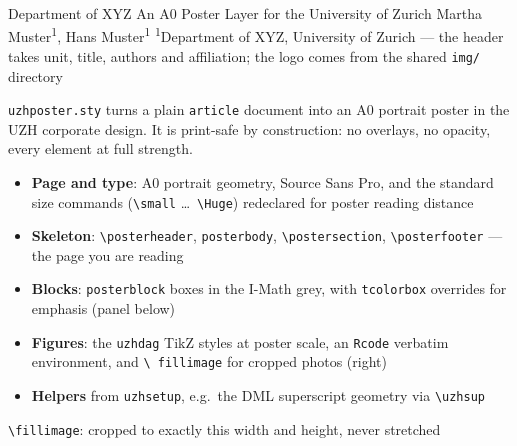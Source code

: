 \documentclass[10pt]{article}
\begin{document}
\posterheader
  {Department of XYZ}
  {An A0 Poster Layer for the University of Zurich}
  {Martha Muster\textsuperscript{1}, Hans Muster\textsuperscript{1}}
  {\textsuperscript{1}Department of XYZ, University of Zurich ---
   the header takes unit, title, authors and affiliation; the logo comes
   from the shared \texttt{img/} directory}

\begin{posterbody}


\begin{minipage}[c]{0.60\linewidth}
  \texttt{uzhposter.sty} turns a plain \texttt{article} document into an A0
  portrait poster in the UZH corporate design. It is print-safe by
  construction: no overlays, no opacity, every element at full strength.

  \vspace{4mm}
  \begin{itemize}
    \setlength{\itemsep}{2mm}
    \item \textbf{Page and type}: A0 portrait geometry, Source Sans Pro, and
      the standard size commands (\texttt{\textbackslash small} \ldots\
      \texttt{\textbackslash Huge}) redeclared for poster reading distance
    \item \textbf{Skeleton}: \texttt{\textbackslash posterheader},
      \texttt{posterbody}, \texttt{\textbackslash postersection},
      \texttt{\textbackslash posterfooter} --- the page you are reading
    \item \textbf{Blocks}: \texttt{posterblock} boxes in the I-Math grey,
      with \texttt{tcolorbox} overrides for emphasis (panel below)
    \item \textbf{Figures}: the \texttt{uzhdag} TikZ styles at poster scale,
      an \texttt{Rcode} verbatim environment, and \texttt{\textbackslash
      fillimage} for cropped photos (right)
    \item \textbf{Helpers} from \texttt{uzhsetup}, e.g.\ the
      DML superscript geometry via
      \texttt{\textbackslash uzhsup}
  \end{itemize}
\end{minipage}\hfill
\begin{minipage}[c]{0.36\linewidth}
  \begin{center}

    \vspace{2mm}
    {\footnotesize \texttt{\textbackslash fillimage}: cropped to exactly
     this width and height, never stretched}
  \end{center}
\end{minipage}


\end{posterbody}
\end{document}
